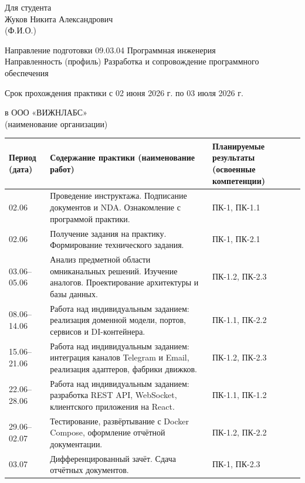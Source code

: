 \documentclass[12pt,a4paper]{report}
\begin{document}
\vspace{1em}

Для студента \hrulefill \\
Жуков Никита Александрович \hrulefill \\
(Ф.И.О.)

Направление подготовки 09.03.04 Программная инженерия \\
Направленность (профиль) Разработка и сопровождение программного обеспечения

Срок прохождения практики с 02 июня 2026 г. по 03 июля 2026 г.

в ООО «ВИЖНЛАБС» \hrulefill \\
(наименование организации)

\vspace{1em}

\begin{tabularx}{\textwidth}{|p{2.8cm}|X|p{3cm}|}
\hline
\textbf{Период (дата)} & \textbf{Содержание практики (наименование работ)} & \textbf{Планируемые результаты (освоенные компетенции)} \\
\hline
02.06 & Проведение инструктажа. Подписание документов и NDA. Ознакомление с программой практики. & ПК-1, ПК-1.1 \\
\hline
02.06 & Получение задания на практику. Формирование технического задания. & ПК-1, ПК-2.1 \\
\hline
03.06–05.06 & Анализ предметной области омниканальных решений. Изучение аналогов. Проектирование архитектуры и базы данных. & ПК-1.2, ПК-2.3 \\
\hline
08.06–14.06 & Работа над индивидуальным заданием: реализация доменной модели, портов, сервисов и DI-контейнера. & ПК-1.1, ПК-2.2 \\
\hline
15.06–21.06 & Работа над индивидуальным заданием: интеграция каналов Telegram и Email, реализация адаптеров, фабрики движков. & ПК-1.2, ПК-2.3 \\
\hline
22.06–28.06 & Работа над индивидуальным заданием: разработка REST API, WebSocket, клиентского приложения на React. & ПК-1.1, ПК-1.2 \\
\hline
29.06–02.07 & Тестирование, развёртывание с Docker Compose, оформление отчётной документации. & ПК-1.2, ПК-2.2 \\
\hline
03.07 & Дифференцированный зачёт. Сдача отчётных документов. & ПК-1, ПК-2.3 \\
\hline
\end{tabularx}

\vspace{2em}
\end{document}

